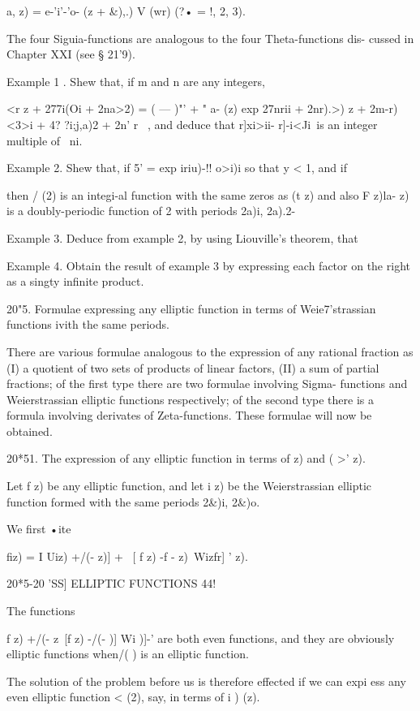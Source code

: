{a, z) = e-'i'-'o- (z + \&),.) V (wr) (?• = !, 2, 3).

The four Siguia-functions are analogous to the four Theta-functions
dis- cussed in Chapter XXI (see § 21'9).

Example 1 . Shew that, if m and n are any integers,

<r z + 277i(Oi + 2na>2) = ( — )"' + " a- (z) exp 27nrii + 2nr).>) z +
2m-r) <3>i + 4? ?i;j,a)2 + 2n' r\ < ia> , and deduce that r]xi>ii-
r]-i<Ji\ is an integer multiple of \ ni.

Example 2. Shew that, if 5' = exp iriu)-!! o>i)i so that y < 1, and if

then / (2) is an integi-al function with the same zeros as (t z) and
also F z)la- z) is a doubly-periodic function of 2 with periods 2a)i,
2a).2-

Example 3. Deduce from example 2, by using Liouville's theorem, that

Example 4. Obtain the result of example 3 by expressing each factor on
the right as a singty infinite product.

20"5. Formulae expressing any elliptic function in terms of
Weie7'strassian functions ivith the same periods.

There are various formulae analogous to the expression of any rational
fraction as (I) a quotient of two sets of products of linear factors,
(II) a sum of partial fractions; of the first type there are two
formulae involving Sigma- functions and Weierstrassian elliptic
functions respectively; of the second type there is a formula
involving derivates of Zeta-functions. These formulae will now be
obtained.

20*51. The expression of any elliptic function in terms of z) and ( >'
z).

Let f z) be any elliptic function, and let i z) be the Weierstrassian
elliptic function formed with the same periods 2\&)i, 2\&)o.

We first •ite

fiz) = I Uiz) +/(- z)] + \ [ f z) -f - z)\ Wizfr] ' z).

20*5-20 'SS] ELLIPTIC FUNCTIONS 44!

The functions

f z) +/(- z\ [f z) -/(- )] Wi )]-' are both even functions, and they
are obviously elliptic functions when/( ) is an elliptic function.

The solution of the problem before us is therefore effected if we can
expi ess any even elliptic function < (2), say, in terms of i ) (z).

}
